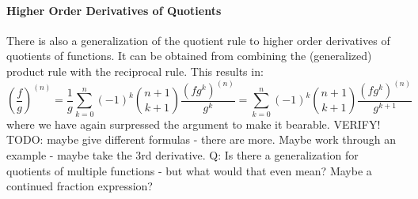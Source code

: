 
\paragraph{Higher Order Derivatives of Quotients}
There is also a generalization of the quotient rule to higher order derivatives of quotients of functions. It can be obtained from combining the (generalized) product rule with the reciprocal rule. This results in:
\begin{equation}
\left( \frac{f}{g} \right) ^{(n)} 
= \frac{1}{g} \sum_{k=0}^{n} (-1)^k \binom{n+1}{k+1} \frac{(f g^k)^{(n)}}{g^k}
= \sum_{k=0}^{n} (-1)^k \binom{n+1}{k+1} \frac{(f g^k)^{(n)}}{g^{k+1}}
\end{equation}
where we have again surpressed the argument to make it bearable. VERIFY! TODO: maybe give different formulas - there are more. Maybe work through an example - maybe take the 3rd derivative. Q: Is there a generalization for quotients of multiple functions - but what would that even mean? Maybe a continued fraction expression? 

